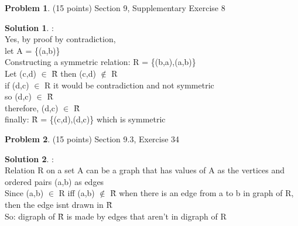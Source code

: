 \documentclass{article}
\theoremstyle{definition}
\newtheorem{problem}{Problem}
\newtheorem*{solution}{Solution}
\begin{document}
\begin{problem} (15 points) Section 9, Supplementary Exercise 8
\end{problem}
\begin{solution} :
\\
Yes, by proof by contradiction,
\\
let A = \{(a,b)\}
\\
Constructing a symmetric relation: R = \{(b,a),(a,b)\}
\\

Let (c,d) $\in$  \~{R} then (c,d) $\notin$ R
\\
if (d,c) $\in$ R it would be contradiction and not symmetric
\\
so (d,c) $\in$ \~{R}
\\
therefore,  (d,c) $\in$ \~{R}
\\
finally: \~{R} = \{(c,d),(d,c)\} which is symmetric

\end{solution}

\newpage

\begin{problem} (15 points) Section 9.3, Exercise 34
\end{problem}
\begin{solution} :
\\
Relation R on a set A can be a graph that has values of A as the vertices and ordered pairs (a,b) as edges \\

Since (a,b) $\in$ R iff (a,b) $\notin$ \~{R} when there is an edge from a to b in graph of R, then the edge isnt drawn in \~{R} \\

So: digraph of \~{R} is made by edges that aren't in digraph of R
\end{solution}

\newpage
\end{document}
